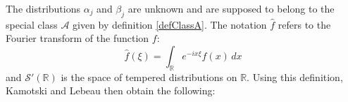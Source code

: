 The distributions $\alpha_j$ and $\beta_j$ are unknown and are supposed to belong to the special class $\mathcal{A}$ given by definition \ref{defClassA}.
The notation $\hat{f}$ refers to the Fourier transform of the function $f$:
\begin{equation}
\hat{f}(\xi)=\int_{\mathbb{R}}e^{-ix\xi}f(x)\,dx
\label{defFouriersimple}
\end{equation}
and $\mathcal{S}'(\mathbb{R})$ is the space of tempered distributions on $\mathbb{R}$. Using this definition, Kamotski and Lebeau \cite{KamotskiLebeau} then obtain the following:
